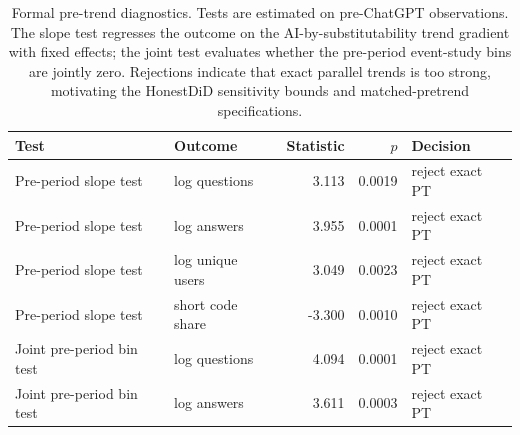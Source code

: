 \begin{table}[ht]
\centering
\caption{Formal pre-trend diagnostics. Tests are estimated on pre-ChatGPT observations. The slope test regresses the outcome on the AI-by-substitutability trend gradient with fixed effects; the joint test evaluates whether the pre-period event-study bins are jointly zero. Rejections indicate that exact parallel trends is too strong, motivating the HonestDiD sensitivity bounds and matched-pretrend specifications.}
\label{tab:formal_pretrend_diagnostics}
\small
\begin{tabular}{llrrl}
\toprule
Test & Outcome & Statistic & $p$ & Decision \\
\midrule
Pre-period slope test & log questions & 3.113 & 0.0019 & reject exact PT \\
Pre-period slope test & log answers & 3.955 & 0.0001 & reject exact PT \\
Pre-period slope test & log unique users & 3.049 & 0.0023 & reject exact PT \\
Pre-period slope test & short code share & -3.300 & 0.0010 & reject exact PT \\
Joint pre-period bin test & log questions & 4.094 & 0.0001 & reject exact PT \\
Joint pre-period bin test & log answers & 3.611 & 0.0003 & reject exact PT \\
\bottomrule
\end{tabular}
\end{table}
